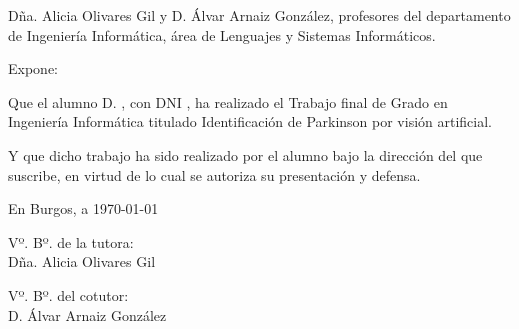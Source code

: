 

\newcommand{\capitulo}[1]{
    \stepcounter{chapter}
    \setcounter{section}{0}
    \setcounter{figure}{0}
    \setcounter{table}{0}
    \chapter*{\thechapter.\enskip #1}
    \addcontentsline{toc}{chapter}{\thechapter.\enskip #1}
    \markboth{#1}{#1}
}





\blankpage
\blankpage

\thispagestyle{empty}
\cabecera

\vfill

\noindent Dña. Alicia Olivares Gil y D. Álvar Arnaiz González, profesores
del departamento de Ingeniería Informática, área de Lenguajes y Sistemas
Informáticos.

\noindent Expone:

\noindent Que el alumno D. \theauthor, con DNI \thedni, ha realizado el
Trabajo final de Grado en Ingeniería Informática titulado Identificación de
Parkinson por visión artificial.

\noindent Y que dicho trabajo ha sido realizado por el alumno bajo la
dirección del que suscribe, en virtud de lo cual se autoriza su presentación
y defensa.

\begin{center}
    En Burgos, a {\large \today}
\end{center}

\vfill\vfill\vfill

\begin{minipage}{0.45\textwidth}
    \begin{flushleft}
        Vº. Bº. de la tutora:\\[2cm]
        Dña. Alicia Olivares Gil
    \end{flushleft}
\end{minipage}
\hfill
\begin{minipage}{0.45\textwidth}
    \begin{flushleft}
        Vº. Bº. del cotutor:\\[2cm]
        D. Álvar Arnaiz González
    \end{flushleft}
\end{minipage}

\hfill
\vfill


